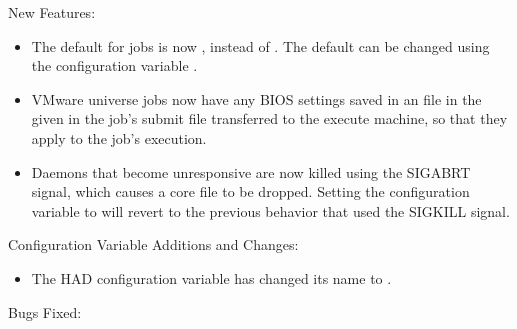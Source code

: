 \noindent New Features:

\begin{itemize}

\item The default  for jobs is now 
, instead of .
The default can be changed using the configuration variable
.

\item VMware  universe jobs now have any BIOS settings saved in
an  file in the  given in the
job's submit file transferred to the execute machine, so that they
apply to the job's execution.

\item Daemons that become unresponsive are now killed using the
SIGABRT signal, which causes a core file to be dropped.
Setting the configuration variable 
to  will revert to the previous behavior that used
the SIGKILL signal.

\end{itemize}

\noindent Configuration Variable Additions and Changes:

\begin{itemize}

\item The HAD configuration variable 
has changed its name to .

\end{itemize}

\noindent Bugs Fixed:

